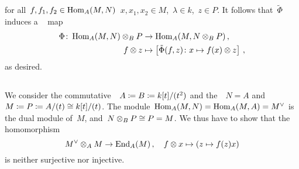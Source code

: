 for all~$f, f_1, f_2 \in \operatorname{Hom}_A(M,N)$~$x, x_1, x_2 \in M$,~$\lambda \in k$,~$z \in P$.
It follows that~$\tilde{\Phi}$ induces a {\welldef}~{\klin} map
\begin{align*}
            \Phi
   \colon   \operatorname{Hom}_A(M, N) \otimes_B P
  &\to      \operatorname{Hom}_A(M, N \otimes_B P) \,,
  \\
            f \otimes z
  &\mapsto  \left[
                      \tilde{\Phi}(f,z)
              \colon  x
              \mapsto f(x) \otimes z
            \right] \,,
\end{align*}
as desired.





\subsection{}

We consider the commutative~{\kalgs}~$A \coloneqq B \coloneqq k[t]/(t^2)$ and the~{}~$N = A$ and~$M \coloneqq P \coloneqq A/(t) \cong k[t]/(t)$.
The module~$\operatorname{Hom}_A(M,N) = \operatorname{Hom}_A(M,A) = M^\vee$ is the dual module of~$M$, and~$N \otimes_B P \cong P = M$.
We thus have to show that the homomorphism
\[
          M^\vee \otimes_A M
  \to     \operatorname{End}_A(M) \,,
  \quad   f \otimes x
  \mapsto (z \mapsto f(z) x)
\]
is neither surjective nor injective.

